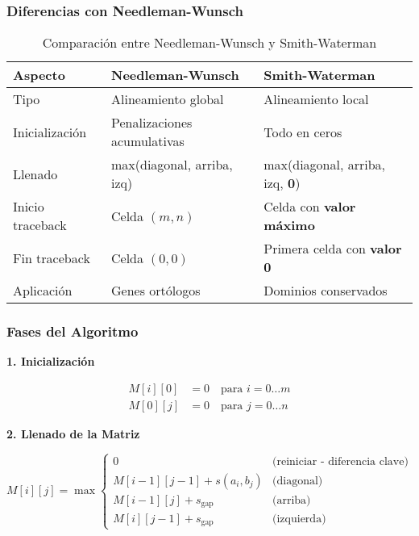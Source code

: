 \documentclass[12pt,a4paper]{article}
\begin{document}
\subsubsection{Diferencias con Needleman-Wunsch}

\begin{table}[H]
\centering
\caption{Comparación entre Needleman-Wunsch y Smith-Waterman}
\begin{tabular}{@{}lll@{}}
\toprule
\textbf{Aspecto} & \textbf{Needleman-Wunsch} & \textbf{Smith-Waterman} \\ \midrule
Tipo & Alineamiento global & Alineamiento local \\
Inicialización & Penalizaciones acumulativas & Todo en ceros \\
Llenado & max(diagonal, arriba, izq) & max(diagonal, arriba, izq, \textbf{0}) \\
Inicio traceback & Celda $(m,n)$ & Celda con \textbf{valor máximo} \\
Fin traceback & Celda $(0,0)$ & Primera celda con \textbf{valor 0} \\
Aplicación & Genes ortólogos & Dominios conservados \\ \bottomrule
\end{tabular}
\label{tab:nw_vs_sw}
\end{table}

\subsubsection{Fases del Algoritmo}

\textbf{1. Inicialización}

\begin{align}
M[i][0] &= 0 \quad \text{para } i = 0 \ldots m \\
M[0][j] &= 0 \quad \text{para } j = 0 \ldots n
\end{align}

\textbf{2. Llenado de la Matriz}

\begin{equation}
M[i][j] = \max \begin{cases}
0 & \text{(reiniciar - diferencia clave)} \\
M[i-1][j-1] + s(a_i, b_j) & \text{(diagonal)} \\
M[i-1][j] + s_{\text{gap}} & \text{(arriba)} \\
M[i][j-1] + s_{\text{gap}} & \text{(izquierda)}
\end{cases}
\end{equation}
\end{document}
